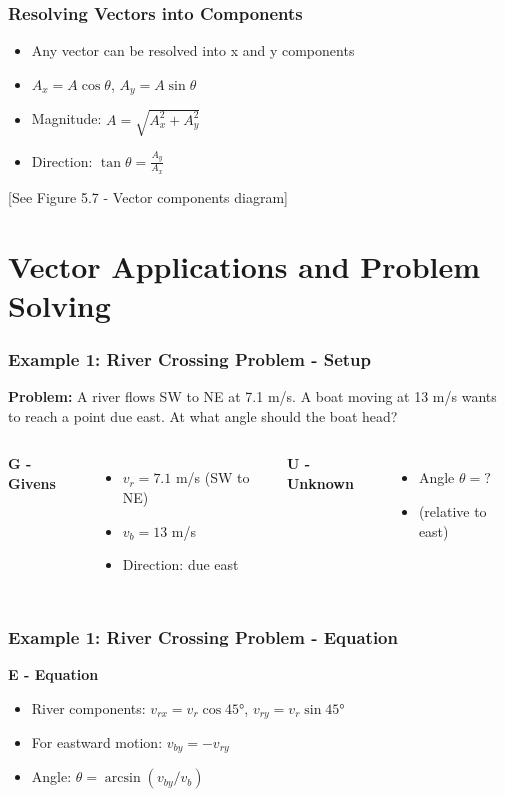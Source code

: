 \documentclass{beamer}
\begin{document}
\begin{frame}
\frametitle{Resolving Vectors into Components}
\begin{itemize}
    \item Any vector can be resolved into x and y components
    \item $A_x = A\cos\theta$, $A_y = A\sin\theta$
    \item Magnitude: $A = \sqrt{A_x^2 + A_y^2}$
    \item Direction: $\tan\theta = \frac{A_y}{A_x}$
\end{itemize}

\vspace{0.3cm}
\alert{[See Figure 5.7 - Vector components diagram]}
\end{frame}

\section{Vector Applications and Problem Solving}

\begin{frame}
\frametitle{Example 1: River Crossing Problem - Setup}
\textbf{Problem:} A river flows SW to NE at 7.1 m/s. A boat moving at 13 m/s wants to reach a point due east. At what angle should the boat head?
\pause
\vspace{0.3cm}

\begin{columns}[T]
\textbf{G - Givens}
\begin{itemize}
\item $v_r = 7.1$ m/s (SW to NE)
\item $v_b = 13$ m/s
\item Direction: due east
\end{itemize}

\textbf{U - Unknown}
\begin{itemize}
\item Angle $\theta = ?$
\item (relative to east)
\end{itemize}
\end{columns}
\end{frame}

\begin{frame}
\frametitle{Example 1: River Crossing Problem - Equation}
\textbf{E - Equation}
\begin{itemize}
\item River components: $v_{rx} = v_r\cos 45°$, $v_{ry} = v_r\sin 45°$ \pause
\item For eastward motion: $v_{by} = -v_{ry}$ \pause
\item Angle: $\theta = \arcsin(v_{by}/v_b)$
\end{itemize}
\end{frame}
\end{document}

